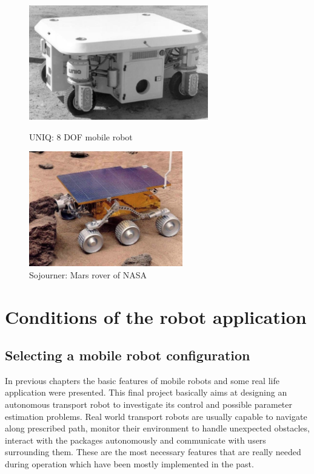 \documentclass[12pt,english]{article}
\begin{document}
\begin{figure}[htb!]
	\centering
	\centering
	\includegraphics[height=5cm]{figures/uniq.png}
	\caption{UNIQ: 8 DOF mobile robot}
	\endminipage\hfill
	\centering
	\includegraphics[height=5cm]{figures/rover.png}
	\caption{Sojourner: Mars rover of NASA}
	\label{mecanum}
	\endminipage\hfill
\end{figure}

\newpage
\section{Conditions of the robot application }
\subsection{Selecting a mobile robot configuration}
In previous chapters the basic features of mobile robots and some real life application were presented. This final project basically aims at designing an autonomous transport robot to investigate its control and possible parameter estimation problems. Real world transport robots are usually capable to navigate along prescribed path, monitor their environment to handle unexpected obstacles, interact with the packages autonomously and communicate with users surrounding them. These are the most necessary features that are really needed during operation which have been mostly implemented in the past.
\end{document}
